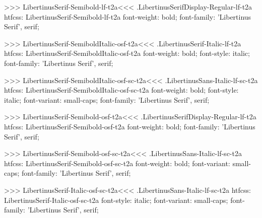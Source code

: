 {{{{{>>>
\<LibertinusSerif-Semibold-lf-t2a\><<<
.LibertinusSerifDisplay-Regular-lf-t2a
htfcss:  LibertinusSerif-Semibold-lf-t2a  font-weight: bold; font-family: 'Libertinus Serif', serif;

>>>
\<LibertinusSerif-SemiboldItalic-osf-t2a\><<<
.LibertinusSerif-Italic-lf-t2a
htfcss:  LibertinusSerif-SemiboldItalic-osf-t2a  font-weight: bold; font-style: italic; font-family: 'Libertinus Serif', serif;

>>>
\<LibertinusSerif-SemiboldItalic-osf-sc-t2a\><<<
.LibertinusSans-Italic-lf-sc-t2a
htfcss:  LibertinusSerif-SemiboldItalic-osf-sc-t2a  font-weight: bold; font-style: italic; font-variant: small-caps; font-family: 'Libertinus Serif', serif;

>>>
\<LibertinusSerif-Semibold-osf-t2a\><<<
.LibertinusSerifDisplay-Regular-lf-t2a
htfcss:  LibertinusSerif-Semibold-osf-t2a  font-weight: bold; font-family: 'Libertinus Serif', serif;

>>>
\<LibertinusSerif-Semibold-osf-sc-t2a\><<<
.LibertinusSans-Italic-lf-sc-t2a
htfcss:  LibertinusSerif-Semibold-osf-sc-t2a  font-weight: bold; font-variant: small-caps; font-family: 'Libertinus Serif', serif;

>>>
\<LibertinusSerif-Italic-osf-sc-t2a\><<<
.LibertinusSans-Italic-lf-sc-t2a
htfcss:  LibertinusSerif-Italic-osf-sc-t2a  font-style: italic; font-variant: small-caps; font-family: 'Libertinus Serif', serif;

}}}}}
